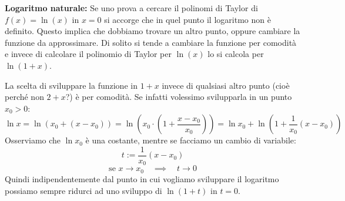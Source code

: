 \textbf{Logaritmo naturale:} Se uno prova a cercare il polinomi di Taylor di $f(x) = \ln{(x)}$ in $x = 0$ si accorge che in quel punto il logaritmo non è definito. Questo implica che dobbiamo trovare un altro punto, oppure cambiare la funzione da approssimare. Di solito si tende a cambiare la funzione per comodità e invece di calcolare il polinomio di Taylor per $\ln{(x)}$ lo si calcola per $\ln{(1 + x)}$.

La scelta di sviluppare la funzione in $1 + x$ invece di qualsiasi altro punto (cioè perché non $2 + x$?) è per comodità. Se infatti volessimo svilupparla in un punto $x_0 > 0$:
\begin{equation*}
	\ln{x} = \ln (x_0 + (x - x_0)) = \ln \left(x_0 \cdot \left(1 + \dfrac{x - x_0}{x_0} \right) \right) = \ln{x_0} + \ln \left( 1 + \dfrac{1}{x_0}(x - x_0) \right)
\end{equation*}
Osserviamo che $\ln{x_0}$ è una costante, mentre se facciamo un cambio di variabile:
\begin{equation*}
	t := \dfrac{1}{x_0} (x - x_0)
\end{equation*}
\begin{equation*}
	\text{se } x \to x_0 \quad \implies \quad t \to 0
\end{equation*}
Quindi indipendentemente dal punto in cui vogliamo sviluppare il logaritmo possiamo sempre ridurci ad uno sviluppo di $\ln(1 + t)$ in $t = 0$. 

